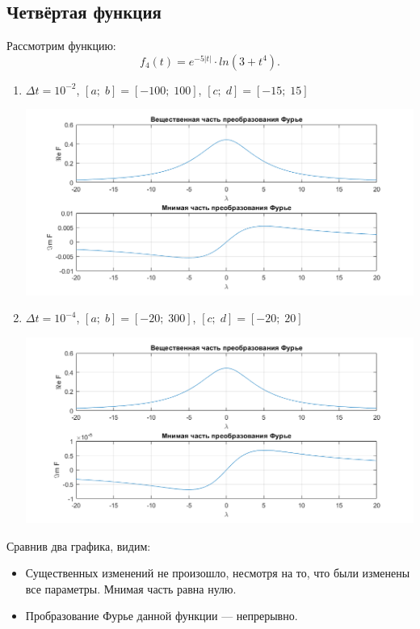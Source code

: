 \documentclass[a4paper, 11pt]{article}
\begin{document}
    \subsection{Четвёртая функция}
        Рассмотрим функцию:
        $$
            f_4(t)=e^{-5|t|} \cdot ln(3+t^4).        
        $$
        \begin{enumerate}
            \item
                $\Delta t = 10^{-2}$, $[a;\; b] = [-100;\; 100]$, $[c;\;d] = [-15;\;15]$
                
                \includegraphics[width=\linewidth]{img/9.png}
            \item
                $\Delta t = 10^{-4}$, $[a;\; b] = [-20;\; 300]$, $[c;\;d] = [-20;\;20]$
                
                \includegraphics[width=\linewidth]{img/10.png}
        \end{enumerate}
        
        Сравнив два графика, видим:
        \begin{itemize}
            \item
                Существенных изменений не произошло, несмотря на то, что были изменены все параметры. Мнимая часть равна нулю.
            \item
                Пробразование Фурье данной функции — непрерывно.
        \end{itemize}
\clearpage
\end{document}
